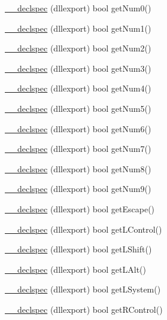 \begin{DoxyCompactItemize}
\item 
\hyperlink{class_keyboard_aca5bfe6b7c8cb215be39b0048d1f55cf}{\-\_\-\-\_\-declspec} (dllexport) bool get\-Num0()
\item 
\hyperlink{class_keyboard_a09b4b1afa0107c384f0c56d7a0bd3e16}{\-\_\-\-\_\-declspec} (dllexport) bool get\-Num1()
\item 
\hyperlink{class_keyboard_a34ef0149e172ee0abc1d826292cfc3e5}{\-\_\-\-\_\-declspec} (dllexport) bool get\-Num2()
\item 
\hyperlink{class_keyboard_a23a6b98fe76d7a1882b816552e67cbb7}{\-\_\-\-\_\-declspec} (dllexport) bool get\-Num3()
\item 
\hyperlink{class_keyboard_a30ad8d0bc130267b1dc388763727ac88}{\-\_\-\-\_\-declspec} (dllexport) bool get\-Num4()
\item 
\hyperlink{class_keyboard_a15d9f60afc4b881116c4efe1cd31e97b}{\-\_\-\-\_\-declspec} (dllexport) bool get\-Num5()
\item 
\hyperlink{class_keyboard_a3d3a752b1e6e6c83f4b81d9ec1909269}{\-\_\-\-\_\-declspec} (dllexport) bool get\-Num6()
\item 
\hyperlink{class_keyboard_a57d16589badaf8dcc5daaf336a3d2158}{\-\_\-\-\_\-declspec} (dllexport) bool get\-Num7()
\item 
\hyperlink{class_keyboard_ac9bae86e074ab1fe387d1f1c1de2ef6a}{\-\_\-\-\_\-declspec} (dllexport) bool get\-Num8()
\item 
\hyperlink{class_keyboard_aec298fdad17fff1b05c8a5bc8b22f8b7}{\-\_\-\-\_\-declspec} (dllexport) bool get\-Num9()
\item 
\hyperlink{class_keyboard_a6fe7c2b77d3909e8f28579b31e99c113}{\-\_\-\-\_\-declspec} (dllexport) bool get\-Escape()
\item 
\hyperlink{class_keyboard_a973f0d3e0b9bb8d886bc90c9ea660a66}{\-\_\-\-\_\-declspec} (dllexport) bool get\-L\-Control()
\item 
\hyperlink{class_keyboard_a845206137a890ddb2862fb7d61f5e432}{\-\_\-\-\_\-declspec} (dllexport) bool get\-L\-Shift()
\item 
\hyperlink{class_keyboard_aa045ea832c04bfafcb7c138caff63ccf}{\-\_\-\-\_\-declspec} (dllexport) bool get\-L\-Alt()
\item 
\hyperlink{class_keyboard_a28e929e026af5cb57329a948f39ad747}{\-\_\-\-\_\-declspec} (dllexport) bool get\-L\-System()
\item 
\hyperlink{class_keyboard_a10677bfed876da9143d4a970689b774c}{\-\_\-\-\_\-declspec} (dllexport) bool get\-R\-Control()
\item 

\end{DoxyCompactItemize}
